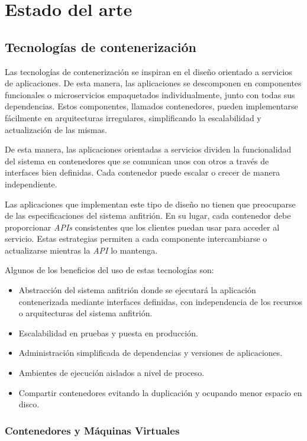 \chapter{Estado del arte}
\label{cha:state_of_art}


\section{Tecnologías de contenerización}

Las tecnologías de contenerización se inspiran en el diseño orientado a servicios de aplicaciones. De esta manera, las aplicaciones se descomponen en componentes funcionales o microservicios empaquetados individualmente, junto con todas sus dependencias. Estos componentes, llamados contenedores, pueden implementarse fácilmente en arquitecturas irregulares, simplificando la escalabilidad y actualización de las mismas.

De esta manera, las aplicaciones orientadas a servicios dividen la funcionalidad del sistema en contenedores que se comunican unos con otros a través de interfaces bien definidas. Cada contenedor puede escalar o crecer de manera independiente.

Las aplicaciones que implementan este tipo de diseño no tienen que preocuparse de las especificaciones del sistema anfitrión. En su lugar, cada contenedor debe proporcionar \textit{APIs} consistentes que los clientes puedan usar para acceder al servicio. Estas estrategias permiten a cada componente intercambiarse o actualizarse mientras la \textit{API} lo mantenga.

Algunos de los beneficios del uso de estas tecnologías son:
\begin{itemize}
\item Abstracción del sistema anfitrión donde se ejecutará la aplicación contenerizada mediante interfaces definidas, con independencia de los recursos o arquitecturas del sistema anfitrión.
\item Escalabilidad en pruebas y puesta en producción.
\item Administración simplificada de dependencias y versiones de aplicaciones.
\item Ambientes de ejecución aislados a nivel de proceso.
\item Compartir contenedores evitando la duplicación y ocupando menor espacio en disco.
\end{itemize}

\subsection{Contenedores y Máquinas Virtuales}

